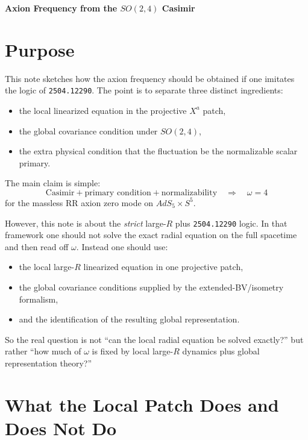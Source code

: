 \documentclass[12pt]{article}
\begin{document}
\sloppy

\begin{center}
{\Large\bf Axion Frequency from the \texorpdfstring{$SO(2,4)$}{SO(2,4)} Casimir}
\end{center}

\section{Purpose}

This note sketches how the axion frequency should be obtained if one imitates the logic of
\texttt{2504.12290}.  The point is to separate three distinct ingredients:
\begin{itemize}
\item the local linearized equation in the projective $X^a$ patch,
\item the global covariance condition under $SO(2,4)$,
\item the extra physical condition that the fluctuation be the normalizable scalar primary.
\end{itemize}

The main claim is simple:
\begin{equation}
\text{Casimir} + \text{primary condition} + \text{normalizability}
\quad \Longrightarrow \quad
\omega=4
\end{equation}
for the massless RR axion zero mode on $AdS_5\times S^5$.

However, this note is about the \emph{strict} large-$R$ plus \texttt{2504.12290} logic.  In that
framework one should not solve the exact radial equation on the full spacetime and then read off
$\omega$.  Instead one should use:
\begin{itemize}
\item the local large-$R$ linearized equation in one projective patch,
\item the global covariance conditions supplied by the extended-BV/isometry formalism,
\item and the identification of the resulting global representation.
\end{itemize}
So the real question is not ``can the local radial equation be solved exactly?'' but rather
``how much of $\omega$ is fixed by local large-$R$ dynamics plus global representation theory?''

\section{What the Local Patch Does and Does Not Do}
\end{document}
